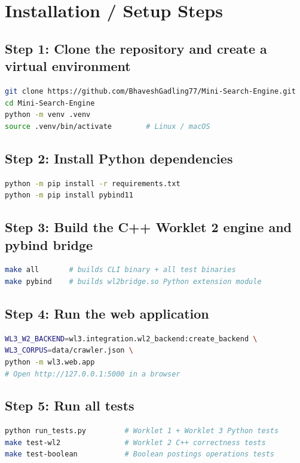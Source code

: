 \documentclass[12pt]{article}
\begin{document}
\section*{Installation / Setup Steps}

\subsection*{Step 1: Clone the repository and create a virtual environment}
\begin{lstlisting}[style=darkcode, language=bash]
git clone https://github.com/BhaveshGadling77/Mini-Search-Engine.git
cd Mini-Search-Engine
python -m venv .venv
source .venv/bin/activate        # Linux / macOS
\end{lstlisting}

\subsection*{Step 2: Install Python dependencies}
\begin{lstlisting}[style=darkcode, language=bash]
python -m pip install -r requirements.txt
python -m pip install pybind11
\end{lstlisting}

\subsection*{Step 3: Build the C++ Worklet 2 engine and pybind bridge}
\begin{lstlisting}[style=darkcode, language=bash]
make all       # builds CLI binary + all test binaries
make pybind    # builds wl2bridge.so Python extension module
\end{lstlisting}

\subsection*{Step 4: Run the web application}
\begin{lstlisting}[style=darkcode, language=bash]
WL3_W2_BACKEND=wl3.integration.wl2_backend:create_backend \
WL3_CORPUS=data/crawler.json \
python -m wl3.web.app
# Open http://127.0.0.1:5000 in a browser
\end{lstlisting}

\subsection*{Step 5: Run all tests}
\begin{lstlisting}[style=darkcode, language=bash]
python run_tests.py         # Worklet 1 + Worklet 3 Python tests
make test-wl2               # Worklet 2 C++ correctness tests
make test-boolean           # Boolean postings operations tests
\end{lstlisting}
\end{document}
